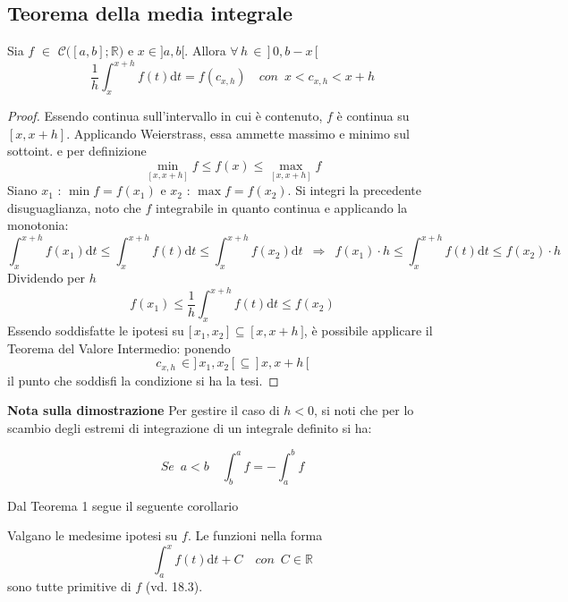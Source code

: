 \documentclass[10pt, oneside]{book}
\theoremstyle{plain}
\begin{document}
\subsection{Teorema della media integrale}
\begin{ther}[della m.i.]
    Sia $f$ $\in$ $\mathcal{C}\big([a,b] ; \mathbb{R}\big)$ e $x \in ]a,b[$. Allora $\forall \, h \, \in \, \big] \, 0, b - x \, \big[$
    \[\frac{1}{h}\int_x^{x+h}f(t)\textrm{d}t = f(c_{x,h}) \quad con \enspace x < c_{x,h} < x+h\]
\end{ther}
\begin{proof}
    Essendo continua sull'intervallo in cui è contenuto, $f$ è continua su $[x, x+h]$. Applicando Weierstrass, essa ammette massimo e minimo sul sottoint. e per definizione
    \[\min\limits_{[x, x+h]} f \leq f(x) \leq \max\limits_{[x, x+h]} f\]
    Siano $x_1$ : $\min f = f(x_1)$ e $x_2$ : $\max f = f(x_2)$. Si integri la precedente disuguaglianza, noto che $f$ integrabile in quanto continua e applicando la monotonia:
    \[\int_x^{x+h} f(x_1)\textrm{d}t\leq \int_x^{x+h} f(t)\textrm{d}t \leq \int_x^{x+h} f(x_2)\textrm{d}t \enspace \Rightarrow \enspace f(x_1) \cdot h \leq \int_x^{x+h} f(t)\textrm{d}t \leq f(x_2) \cdot h\]
    Dividendo per $h$
    \[f(x_1) \leq \frac{1}{h} \int_x^{x+h} f(t)\textrm{d}t \leq f(x_2)\]
    Essendo soddisfatte le ipotesi su $\displaystyle \big[ \, x_1, x_2 \, \big] \, \subseteq \, \big[ \, x, x+h \, \big]$, è possibile applicare il Teorema del Valore Intermedio: ponendo 
\[ c_{x,h} \, \in \big] \, x_1, x_2 \, \big[ \, \subseteq \, \big] \, x, x+h \, \big[ \]
il punto che soddisfi la condizione si ha la tesi.
\end{proof}
\textbf{Nota sulla dimostrazione} Per gestire il caso di $h < 0$, si noti che per lo scambio degli estremi di integrazione di un integrale definito si ha:

\begin{oss}
    \[Se \enspace a < b \quad \int_b^a f = - \int_a^b f\]
\end{oss}

Dal Teorema 1 segue il seguente corollario
\begin{cor}
    Valgano le medesime ipotesi su $f$. Le funzioni nella forma 
    \[\int_a^x f(t)\textrm{d}t + C \quad con \enspace C \in \mathbb{R}\]
    sono tutte primitive di $f$ (vd. 18.3).
\end{cor}
\end{document}
